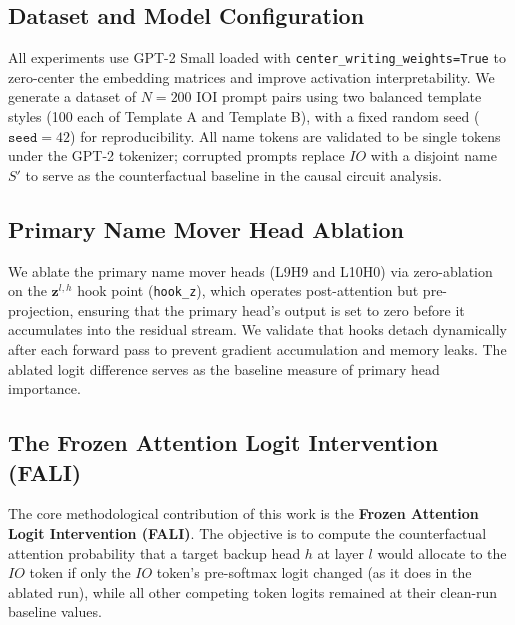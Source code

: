 \documentclass[12pt,a4paper]{article}
\begin{document}
\subsection{Dataset and Model Configuration}
\label{subsec:dataset}

All experiments use GPT-2 Small loaded with \texttt{center\_writing\_weights=True}
to zero-center the embedding matrices and improve activation interpretability.
We generate a dataset of $N=200$ IOI prompt pairs using two balanced template
styles (100 each of Template A and Template B), with a fixed random seed
($\texttt{seed}=42$) for reproducibility. All name tokens are validated to be
single tokens under the GPT-2 tokenizer; corrupted prompts replace $IO$ with
a disjoint name $S'$ to serve as the counterfactual baseline in the causal
circuit analysis.

\subsection{Primary Name Mover Head Ablation}
\label{subsec:ablation}

We ablate the primary name mover heads (L9H9 and L10H0) via zero-ablation on
the $\mathbf{z}^{l,h}$ hook point (\texttt{hook\_z}), which operates post-attention
but pre-projection, ensuring that the primary head's output is set to zero before
it accumulates into the residual stream. We validate that hooks detach
dynamically after each forward pass to prevent gradient accumulation and memory
leaks. The ablated logit difference serves as the baseline measure of primary
head importance.

\subsection{The Frozen Attention Logit Intervention (FALI)}
\label{subsec:fali}

The core methodological contribution of this work is the \textbf{Frozen Attention
Logit Intervention (FALI)}. The objective is to compute the counterfactual
attention probability that a target backup head $h$ at layer $l$ would allocate
to the $IO$ token if only the $IO$ token's pre-softmax logit changed (as it does
in the ablated run), while all other competing token logits remained at their
clean-run baseline values.
\end{document}
